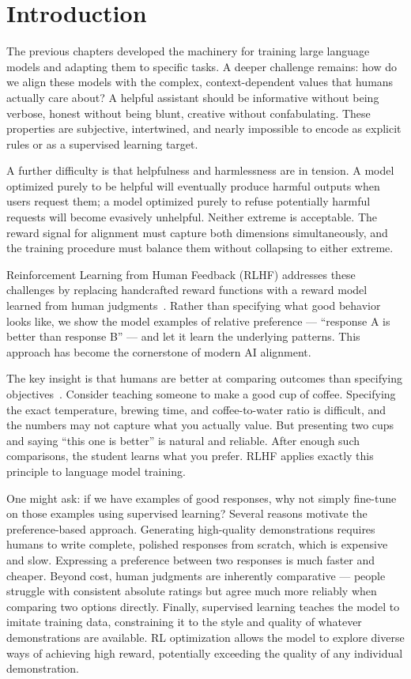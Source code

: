 \documentclass{book}
\begin{document}
\section{Introduction}
\label{sec:rlhf_intro}

The previous chapters developed the machinery for training large language
models and adapting them to specific tasks. A deeper challenge remains:
how do we align these models with the complex, context-dependent values
that humans actually care about? A helpful assistant should be informative
without being verbose, honest without being blunt, creative without
confabulating. These properties are subjective, intertwined, and nearly
impossible to encode as explicit rules or as a supervised learning target.

A further difficulty is that helpfulness and harmlessness are in tension.
A model optimized purely to be helpful will eventually produce harmful
outputs when users request them; a model optimized purely to refuse
potentially harmful requests will become evasively unhelpful. Neither
extreme is acceptable. The reward signal for alignment must capture both
dimensions simultaneously, and the training procedure must balance them
without collapsing to either extreme.

Reinforcement Learning from Human Feedback (RLHF) addresses these
challenges by replacing handcrafted reward functions with a reward model
learned from human judgments~\cite{christiano2017,ouyang2022training}.
Rather than specifying what good behavior looks like, we show the model
examples of relative preference --- ``response A is better than response B''
--- and let it learn the underlying patterns. This approach has become the
cornerstone of modern AI alignment.

The key insight is that humans are better at comparing outcomes than
specifying objectives~\cite{christiano2017}. Consider teaching someone to
make a good cup of coffee. Specifying the exact temperature, brewing time,
and coffee-to-water ratio is difficult, and the numbers may not capture
what you actually value. But presenting two cups and saying ``this one is
better'' is natural and reliable. After enough such comparisons, the student
learns what you prefer. RLHF applies exactly this principle to language
model training.

One might ask: if we have examples of good responses, why not simply
fine-tune on those examples using supervised learning? Several reasons
motivate the preference-based approach. Generating high-quality
demonstrations requires humans to write complete, polished responses from
scratch, which is expensive and slow. Expressing a preference between two
responses is much faster and cheaper. Beyond cost, human judgments are
inherently comparative --- people struggle with consistent absolute ratings
but agree much more reliably when comparing two options directly. Finally,
supervised learning teaches the model to imitate training data, constraining
it to the style and quality of whatever demonstrations are available. RL
optimization allows the model to explore diverse ways of achieving high
reward, potentially exceeding the quality of any individual demonstration.
\end{document}
